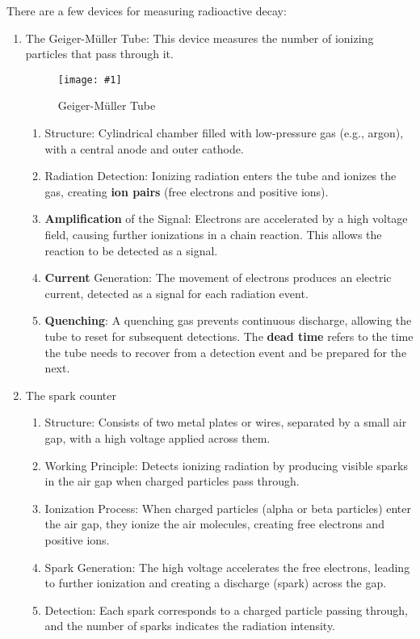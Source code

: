 \documentclass[a4paper,12pt]{article}
\newcommand{\img}[4]{\begin{center}
  \begin{figure}[H]
    \centering
    \texttt{[image: \#1]}
    \caption{#3}
    \label{fig:#4}
  \end{figure}
\end{center}}
\begin{document}
There are a few devices for measuring radioactive decay:
\begin{enumerate}
  \item The Geiger-Müller Tube: This device measures the number of ionizing particles that pass through it.
        \img{muller.png}{1}{Geiger-Müller Tube}{muller}
        \begin{enumerate}
          \item Structure: Cylindrical chamber filled with low-pressure gas (e.g., argon), with a central anode and outer cathode.
          \item Radiation Detection: Ionizing radiation enters the tube and ionizes the gas, creating \textbf{ion pairs} (free electrons and positive ions).
          \item \textbf{Amplification} of the Signal: Electrons are accelerated by a high voltage field, causing further ionizations in a chain reaction. This allows the reaction to be detected as a signal.
          \item \textbf{Current} Generation: The movement of electrons produces an electric current, detected as a signal for each radiation event.
          \item \textbf{Quenching}: A quenching gas prevents continuous discharge, allowing the tube to reset for subsequent detections. The \textbf{dead time} refers to the time the tube needs to recover from a detection event and be prepared for the next.
        \end{enumerate}
  \item The spark counter
        \begin{enumerate}
          \item Structure: Consists of two metal plates or wires, separated by a small air gap, with a high voltage applied across them.
          \item Working Principle: Detects ionizing radiation by producing visible sparks in the air gap when charged particles pass through.
          \item Ionization Process: When charged particles (alpha or beta particles) enter the air gap, they ionize the air molecules, creating free electrons and positive ions.
          \item Spark Generation: The high voltage accelerates the free electrons, leading to further ionization and creating a discharge (spark) across the gap.
          \item Detection: Each spark corresponds to a charged particle passing through, and the number of sparks indicates the radiation intensity.
        \end{enumerate}
\end{enumerate}
\end{document}
